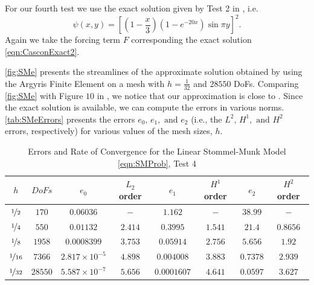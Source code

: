 For our fourth test we use the exact solution given by Test 2 in \cite{Cascon},
i.e.
{\small
\begin{equation}
  \psi(x,y) = \left[\left(1 - \frac{x}{3}\right)\left(1-e^{-20x}\right) \sin \pi y\right]^2.
  \label{eqn:CasconExact2}
\end{equation}
}
Again we take the forcing term $F$ corresponding the exact solution
\eqref{eqn:CasconExact2}.

\autoref{fig:SMe} presents the streamlines of the approximate solution obtained
by using the Argyris Finite Element on a mesh with $h=\frac{1}{32}$ and $28550$
DoFs. Comparing \autoref{fig:SMe} with Figure $10$ in \cite{Myers}, we notice
that our approximation is close to \cite{Myers}. Since the exact solution is
available, we can compute the errors in various norms. \autoref{tab:SMeErrors}
presents the errors $e_0,\, e_1, \text{ and } e_2$ (i.e., the $L^2,\, H^1,
\text{ and } H^2$ errors, respectively) for various values of the mesh sizes,
$h$.

\begin{table}%
\begin{center}
\begin{tabular}{|c|c|c|c|c|c|c|c|}%
  \hline
  $h$ & $DoFs$ & $e_0$ & $L_2$ order & $e_1$ & $H^1$ order & $e_2$ & $H^2$ order \\[0.2em] %
  \hline
  $\nicefrac{1}{2}$ & $170$ & $0.06036$ & $-$ & $1.162$ & $-$ & $38.99$ & $-$ \\[0.2em] %
  $\nicefrac{1}{4}$ & $550$ & $0.01132$ & $2.414$ & $0.3995$ & $1.541$ & $21.4$ & $0.8656$ \\[0.2em] %
  $\nicefrac{1}{8}$ & $1958$ & $0.0008399$ & $3.753$ & $0.05914$ & $2.756$ & $5.656$ & $1.92$ \\[0.2em] %
  $\nicefrac{1}{16}$ & $7366$ & $2.817\times 10^{-5}$ & $4.898$ & $0.004008$ & $3.883$ & $0.7378$ & $2.939$ \\[0.2em] %
  $\nicefrac{1}{32}$ & $28550$ & $5.587\times 10^{-7}$ & $5.656$ & $0.0001607$ & $4.641$ & $0.0597$ & $3.627$ \\[0.2em] %
 \hline
\end{tabular}
\end{center}
\caption{Errors and Rate of Convergence for the Linear Stommel-Munk Model \eqref{eqn:SMProb}, Test 4 \cite{Cascon}}
\label{tab:SMeErrors}
\end{table}

